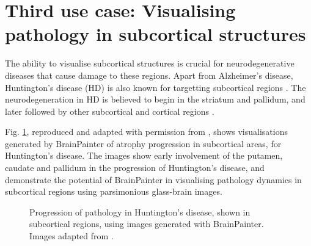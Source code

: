 \documentclass{llncs}
\begin{document}
\section{Third use case: Visualising pathology in subcortical structures}
\label{progression}

The ability to visualise subcortical structures is crucial for neurodegenerative diseases that cause damage to these regions. Apart from Alzheimer's disease, Huntington's disease (HD) is also known for targetting subcortical regions \cite{douaud2009vivo,wijeratne2018image}. The neurodegeneration in HD is believed to begin in the striatum and pallidum, and later followed by other subcortical and cortical regions \cite{douaud2009vivo}.

Fig. \ref{fig:peter}, reproduced and adapted with permission from \cite{wijeratne2018image}, shows visualisations generated by BrainPainter of atrophy progression in subcortical areas, for Huntington's disease. The images show early involvement of the putamen, caudate and pallidum in the progression of Huntington's disease, and demonstrate the potential of BrainPainter in visualising pathology dynamics in subcortical regions using parsimonious glass-brain images.


\begin{figure}[htp]
\centering
 \caption{Progression of pathology in Huntington's disease, shown in subcortical regions, using images generated with BrainPainter. Images adapted from \cite{wijeratne2018image}.}
   \label{fig:peter}
\end{figure}
\end{document}
